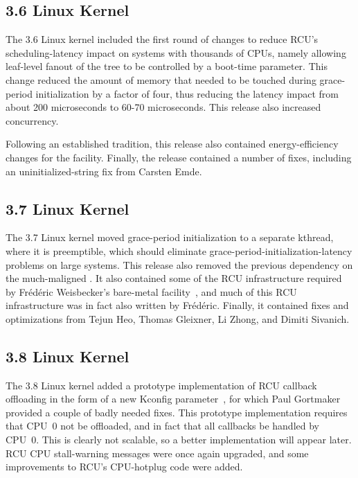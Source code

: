 \subsection{3.6 Linux Kernel}

The 3.6 Linux kernel included the first round of changes to reduce
RCU's scheduling-latency impact on systems with thousands of CPUs,
namely allowing leaf-level fanout of the  tree to be
controlled by a boot-time parameter.
This change reduced the amount of memory that needed to be touched
during grace-period initialization by a factor of four, thus reducing
the latency impact from about 200 microseconds to 60-70 microseconds.
This release also increased  concurrency.

Following an established tradition, this release also contained
energy-efficiency changes for the 
facility.
Finally, the release contained a number of fixes, including
an uninitialized-string fix from Carsten Emde.

\subsection{3.7 Linux Kernel}

The 3.7 Linux kernel moved grace-period initialization to a separate
kthread, where it is preemptible, which should eliminate
grace-period-initialization-latency problems on large systems.
This release also removed the previous  dependency
on the much-maligned .
It also contained some of the RCU infrastructure required by
Fr\'ed\'eric Weisbecker's  bare-metal
facility~\cite{JonCorbet2013NO-HZ-FULL}, and much of this RCU
infrastructure was in fact also written by Fr\'ed\'eric.
Finally, it contained fixes and optimizations from Tejun Heo,
Thomas Gleixner, Li Zhong, and Dimiti Sivanich.

\subsection{3.8 Linux Kernel}

The 3.8 Linux kernel added a prototype implementation of RCU callback
offloading in the form of a new  Kconfig
parameter~\cite{JonCorbet2012NOCB}, for which Paul Gortmaker provided
a couple of badly needed fixes.
This prototype implementation requires that CPU~0 not be offloaded,
and in fact that all callbacks be handled by CPU~0.
This is clearly not scalable, so a better implementation will appear later.
RCU CPU stall-warning messages were once again upgraded, and some
improvements to RCU's CPU-hotplug code were added.

